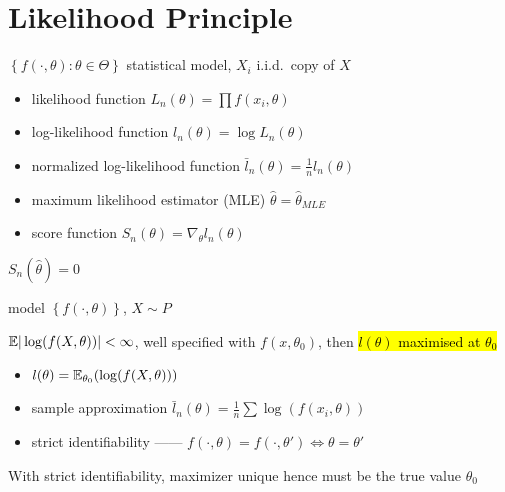 \section{Likelihood Principle}\label{sec:likelihood-principle}

\begin{setting}
    $\left\{ f(\cdot, \theta)  : \theta \in \Theta \right\}$ statistical model, $X_i$ i.i.d.\  copy of $X$
\end{setting}

\begin{itemize}
    \item likelihood function $L_n(\theta) = \prod f(x_i, \theta)$
    \item log-likelihood function $l_n(\theta) = \log L_n(\theta)$
    \item normalized log-likelihood function $\bar{l}_n(\theta) = \frac{1}{n}l_n(\theta)$
\end{itemize}

\begin{itemize}
    \item maximum likelihood estimator (MLE) $\hat{\theta} = \hat{\theta}_{MLE}$
    \item score function $S_n(\theta) = \nabla_\theta l_n(\theta)$
\end{itemize}

\begin{fact}
    $S_{n}(\hat{\theta}) = 0$
\end{fact}

\begin{setting}
    model $\left\{ f(\cdot, \theta) \right\}$, $X \sim P$
\end{setting}

\begin{thm}
    $\mathbb{E}|\log(f(X, \theta))| < \infty$, well specified with $f(x, \theta_0)$, then \hl{$l(\theta)$ maximised at $\theta_0$}
\end{thm}

\begin{itemize}
    \item $l(\theta) = \mathbb{E}_{\theta_0}(\log(f(X, \theta)))$
    \item sample approximation $\bar{l}_n(\theta) = \frac{1}{n} \sum \log(f(x_i, \theta))$
    \item strict identifiability ------ $f(\cdot, \theta) = f(\cdot, \theta') \iff \theta = \theta'$
\end{itemize}

\begin{fact}
    With strict identifiability, maximizer unique hence must be the true value $\theta_0$
\end{fact}


